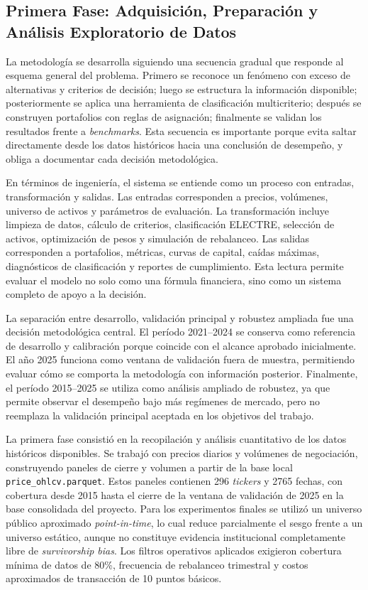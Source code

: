 \documentclass[12pt,letterpaper]{article}
\begin{document}
\subsection{Primera Fase: Adquisición, Preparación y Análisis Exploratorio de Datos}

La metodología se desarrolla siguiendo una secuencia gradual que responde al esquema general del problema. Primero se reconoce un fenómeno con exceso de alternativas y criterios de decisión; luego se estructura la información disponible; posteriormente se aplica una herramienta de clasificación multicriterio; después se construyen portafolios con reglas de asignación; finalmente se validan los resultados frente a \textit{benchmarks}. Esta secuencia es importante porque evita saltar directamente desde los datos históricos hacia una conclusión de desempeño, y obliga a documentar cada decisión metodológica.

En términos de ingeniería, el sistema se entiende como un proceso con entradas, transformación y salidas. Las entradas corresponden a precios, volúmenes, universo de activos y parámetros de evaluación. La transformación incluye limpieza de datos, cálculo de criterios, clasificación ELECTRE, selección de activos, optimización de pesos y simulación de rebalanceo. Las salidas corresponden a portafolios, métricas, curvas de capital, caídas máximas, diagnósticos de clasificación y reportes de cumplimiento. Esta lectura permite evaluar el modelo no solo como una fórmula financiera, sino como un sistema completo de apoyo a la decisión.

La separación entre desarrollo, validación principal y robustez ampliada fue una decisión metodológica central. El período 2021--2024 se conserva como referencia de desarrollo y calibración porque coincide con el alcance aprobado inicialmente. El año 2025 funciona como ventana de validación fuera de muestra, permitiendo evaluar cómo se comporta la metodología con información posterior. Finalmente, el período 2015--2025 se utiliza como análisis ampliado de robustez, ya que permite observar el desempeño bajo más regímenes de mercado, pero no reemplaza la validación principal aceptada en los objetivos del trabajo.


La primera fase consistió en la recopilación y análisis cuantitativo de los datos históricos disponibles. Se trabajó con precios diarios y volúmenes de negociación, construyendo paneles de cierre y volumen a partir de la base local \texttt{price\_ohlcv.parquet}. Estos paneles contienen 296 \textit{tickers} y 2765 fechas, con cobertura desde 2015 hasta el cierre de la ventana de validación de 2025 en la base consolidada del proyecto. Para los experimentos finales se utilizó un universo público aproximado \textit{point-in-time}, lo cual reduce parcialmente el sesgo frente a un universo estático, aunque no constituye evidencia institucional completamente libre de \textit{survivorship bias}. Los filtros operativos aplicados exigieron cobertura mínima de datos de 80\%, frecuencia de rebalanceo trimestral y costos aproximados de transacción de 10 puntos básicos.
\end{document}
